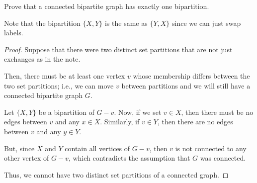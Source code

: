 \documentclass[../hw5]{subfiles}
\begin{document}
\begin{problem}
Prove that a connected bipartite graph has exactly one bipartition.
\end{problem}
Note that the bipartition $\{X,Y\} $ is the same as $\{Y,X\} $ since we can just swap labels.
\begin{proof}


	Suppose that there were two distinct set partitions that are not just exchanges as in the note.

	Then, there must be at least one vertex $v$ whose membership differs between the two set partitions; i.e., we can move  $v$ between partitions and we will still have a connected bipartite graph $G$.

	Let $\{X,Y\} $ be a bipartition of  $G-v$.
	Now, if we set $v \in X$, then there must be no edges between $v$ and any  $x \in X$.
	Similarly, if $v\in Y$, then there are no edges between $v$ and any  $y \in Y$.

	But, since $X$ and $Y$ contain all vertices of $G-v$,
	then $v$ is not connected to any other vertex of $G-v$, which contradicts the assumption that $G$ was connected.

	Thus, we cannot have two distinct set partitions of a connected graph.
\end{proof}
\end{document}
